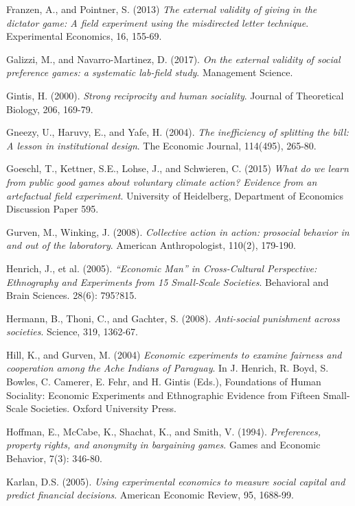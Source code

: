 \documentclass[12pt]{article}
\begin{document}
\begin{thebibliography}{9}
Franzen, A., and Pointner, S. (2013)
\textit{The external validity of giving in the dictator game: A field experiment using the misdirected letter technique}.
Experimental Economics, 16, 155-69.

Galizzi, M., and Navarro-Martinez, D. (2017).
\textit{On the external validity of social preference games: a systematic lab-field study}.
Management Science.

Gintis, H. (2000).
\textit{Strong reciprocity and human sociality}.
Journal of Theoretical Biology, 206, 169-79.

Gneezy, U., Haruvy, E., and Yafe, H. (2004).
\textit{The inefficiency of splitting the bill: A lesson in institutional design}.
The Economic Journal, 114(495), 265-80.

Goeschl, T., Kettner, S.E., Lohse, J., and Schwieren, C. (2015)
\textit{What do we learn from public good games about voluntary climate action? Evidence from an artefactual field experiment}.
University of Heidelberg, Department of Economics Discussion Paper 595.

Gurven, M., Winking, J. (2008).
\textit{Collective action in action: prosocial behavior in and out of the laboratory}.
American Anthropologist, 110(2), 179-190. 


Henrich, J., et al. (2005).
\textit{``Economic Man'' in Cross-Cultural Perspective: Ethnography and Experiments from 15 Small-Scale Societies}.
Behavioral and Brain Sciences. 28(6): 795?815.

Hermann, B., Thoni, C., and Gachter, S. (2008).
\textit{Anti-social punishment across societies}.
Science, 319, 1362-67.

Hill, K., and Gurven, M. (2004)
\textit{Economic experiments to examine fairness and cooperation among the Ache Indians of Paraguay}.
In J. Henrich, R. Boyd, S. Bowles, C. Camerer, E. Fehr, and H. Gintis (Eds.),
Foundations of Human Sociality: Economic Experiments and Ethnographic Evidence from Fifteen Small-Scale Societies. Oxford University Press.

Hoffman, E., McCabe, K., Shachat, K., and Smith, V. (1994).
\textit{Preferences, property rights, and anonymity in bargaining games}.
Games and Economic Behavior, 7(3): 346-80.

Karlan, D.S. (2005).
\textit{Using experimental economics to measure social capital and predict financial decisions}.
American Economic Review, 95, 1688-99.


\end{thebibliography}
\end{document}
